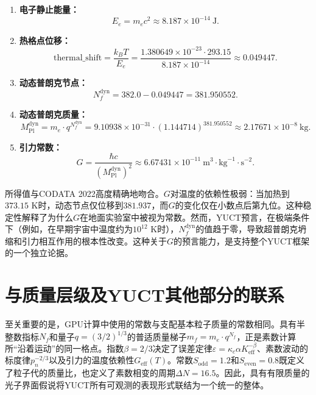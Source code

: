 \documentclass[11pt,a4paper]{article}
\begin{document}
	\begin{enumerate}
		\item \textbf{电子静止能量：}
		\begin{equation}
			E_e = m_e c^2 \approx 8.187 \times 10^{-14}~\text{J}.
		\end{equation}
		\item \textbf{热格点位移：}
		\begin{equation}
			\text{thermal\_shift} = \frac{k_B T}{E_e} = \frac{1.380649 \times 10^{-23} \cdot 293.15}{8.187 \times 10^{-14}} \approx 0.049447.
		\end{equation}
		\item \textbf{动态普朗克节点：}
		\begin{equation}
			N_f^{\text{dyn}} = 382.0 - 0.049447 = 381.950552.
		\end{equation}
		\item \textbf{动态普朗克质量：}
		\begin{equation}
			M_{\text{Pl}}^{\text{dyn}} = m_e \cdot q^{N_f^{\text{dyn}}} = 9.10938 \times 10^{-31} \cdot (1.144714)^{381.950552} \approx 2.17671 \times 10^{-8}~\text{kg}.
		\end{equation}
		\item \textbf{引力常数：}
		\begin{equation}
			G = \frac{\hbar c}{(M_{\text{Pl}}^{\text{dyn}})^2} \approx 6.67431 \times 10^{-11}~\text{m}^3\!\cdot\!\text{kg}^{-1}\!\cdot\!\text{s}^{-2}.
		\end{equation}
	\end{enumerate}
	
	所得值与CODATA 2022高度精确地吻合。$G$对温度的依赖性极弱：当加热到$373.15$ K时，动态节点仅位移到$381.937$，而$G$的变化仅在小数点后第九位。这种稳定性解释了为什么$G$在地面实验室中被视为常数。然而，YUCT预言，在极端条件下（例如，在早期宇宙中温度约为$10^{12}$ K时），$N_f^{\text{dyn}}$的值趋于零，导致超普朗克坍缩和引力相互作用的根本性改变。这种关于$G$的预言能力，是支持整个YUCT框架的一个独立论据。
	
	\section{与质量层级及YUCT其他部分的联系}
	至关重要的是，GPU计算中使用的常数与支配基本粒子质量的常数相同。具有半整数指标$N_f$和量子$q = (3/2)^{1/3}$的普适质量梯子$m_f = m_e \cdot q^{N_f}$，正是素数计算所“沿着运动”的同一格点。指数$\beta = 2/3$决定了误差定律$\varepsilon = \kappa_c \alpha K_{\mathrm{eff}}^{-\beta}$、素数波动的标度律$p_n^{-2/3}$以及引力的温度依赖性$G_{\mathrm{eff}}(T)$。常数$S_{\mathrm{odd}} = 1.2$和$S_{\mathrm{even}} = 0.8$既定义了粒子代的质量比，也定义了素数相变的周期$\Delta N = 16.5$。因此，具有有限质量的光子界面假说将YUCT所有可观测的表现形式联结为一个统一的整体。
	
\end{document}
